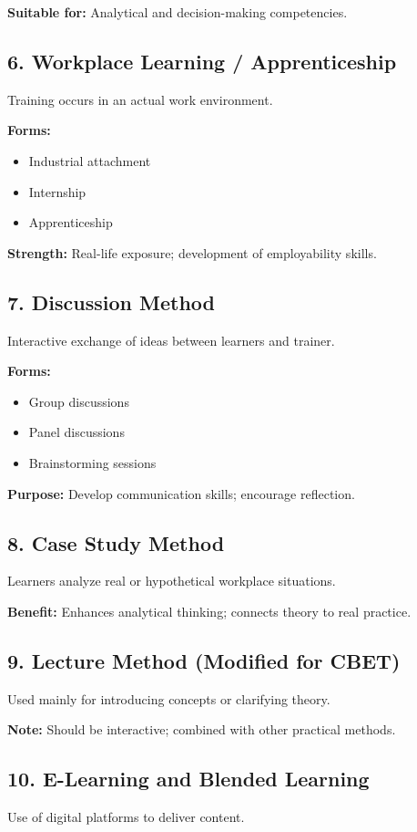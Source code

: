 \documentclass[12pt,a4paper]{article}
\begin{document}
\textbf{Suitable for:} Analytical and decision-making competencies.

\subsection*{6. Workplace Learning / Apprenticeship}
Training occurs in an actual work environment.

\textbf{Forms:}
\begin{itemize}
    \item Industrial attachment
    \item Internship
    \item Apprenticeship
\end{itemize}

\textbf{Strength:} Real-life exposure; development of employability skills.

\subsection*{7. Discussion Method}
Interactive exchange of ideas between learners and trainer.

\textbf{Forms:}
\begin{itemize}
    \item Group discussions
    \item Panel discussions
    \item Brainstorming sessions
\end{itemize}

\textbf{Purpose:} Develop communication skills; encourage reflection.

\subsection*{8. Case Study Method}
Learners analyze real or hypothetical workplace situations.

\textbf{Benefit:} Enhances analytical thinking; connects theory to real practice.

\subsection*{9. Lecture Method (Modified for CBET)}
Used mainly for introducing concepts or clarifying theory.

\textbf{Note:} Should be interactive; combined with other practical methods.

\subsection*{10. E-Learning and Blended Learning}
Use of digital platforms to deliver content.
\end{document}

